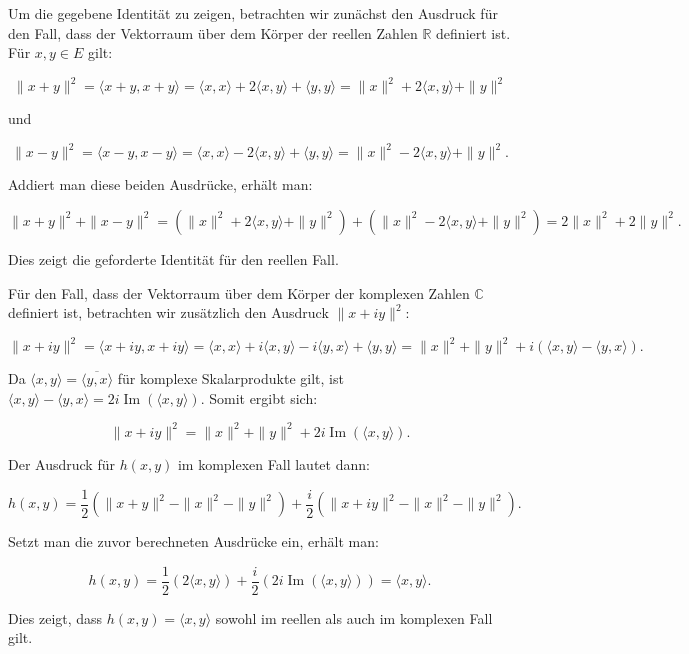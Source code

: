 Um die gegebene Identität zu zeigen, betrachten wir zunächst den Ausdruck für den Fall, dass der Vektorraum über dem Körper der reellen Zahlen $\mathbb{R}$ definiert ist. Für $x, y \in E$ gilt:

\[
\|x+y\|^2 = \langle x+y, x+y \rangle = \langle x, x \rangle + 2 \langle x, y \rangle + \langle y, y \rangle = \|x\|^2 + 2 \langle x, y \rangle + \|y\|^2
\]

und

\[
\|x-y\|^2 = \langle x-y, x-y \rangle = \langle x, x \rangle - 2 \langle x, y \rangle + \langle y, y \rangle = \|x\|^2 - 2 \langle x, y \rangle + \|y\|^2.
\]

Addiert man diese beiden Ausdrücke, erhält man:

\[
\|x+y\|^2 + \|x-y\|^2 = (\|x\|^2 + 2 \langle x, y \rangle + \|y\|^2) + (\|x\|^2 - 2 \langle x, y \rangle + \|y\|^2) = 2\|x\|^2 + 2\|y\|^2.
\]

Dies zeigt die geforderte Identität für den reellen Fall.

Für den Fall, dass der Vektorraum über dem Körper der komplexen Zahlen $\mathbb{C}$ definiert ist, betrachten wir zusätzlich den Ausdruck $\|x+iy\|^2$:

\[
\|x+iy\|^2 = \langle x+iy, x+iy \rangle = \langle x, x \rangle + i \langle x, y \rangle - i \langle y, x \rangle + \langle y, y \rangle = \|x\|^2 + \|y\|^2 + i(\langle x, y \rangle - \langle y, x \rangle).
\]

Da $\langle x, y \rangle = \overline{\langle y, x \rangle}$ für komplexe Skalarprodukte gilt, ist $\langle x, y \rangle - \langle y, x \rangle = 2i \operatorname{Im}(\langle x, y \rangle)$. Somit ergibt sich:

\[
\|x+iy\|^2 = \|x\|^2 + \|y\|^2 + 2i \operatorname{Im}(\langle x, y \rangle).
\]

Der Ausdruck für $h(x, y)$ im komplexen Fall lautet dann:

\[
h(x, y) = \frac{1}{2}(\|x+y\|^2 - \|x\|^2 - \|y\|^2) + \frac{i}{2}(\|x+iy\|^2 - \|x\|^2 - \|y\|^2).
\]

Setzt man die zuvor berechneten Ausdrücke ein, erhält man:

\[
h(x, y) = \frac{1}{2}(2 \langle x, y \rangle) + \frac{i}{2}(2i \operatorname{Im}(\langle x, y \rangle)) = \langle x, y \rangle.
\]

Dies zeigt, dass $h(x, y) = \langle x, y \rangle$ sowohl im reellen als auch im komplexen Fall gilt.